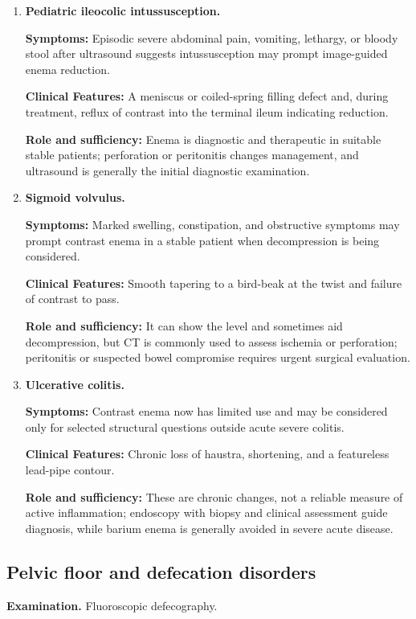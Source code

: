 \begin{enumerate}[leftmargin=*,itemsep=0.45em,topsep=0.4em]
\item \textbf{Pediatric ileocolic intussusception.}\par\noindent\textbf{Symptoms:} Episodic severe abdominal pain, vomiting, lethargy, or bloody stool after ultrasound suggests intussusception may prompt image-guided enema reduction.\par\noindent\textbf{Clinical Features:} A meniscus or coiled-spring filling defect and, during treatment, reflux of contrast into the terminal ileum indicating reduction.\par\noindent\textbf{Role and sufficiency:} Enema is diagnostic and therapeutic in suitable stable patients; perforation or peritonitis changes management, and ultrasound is generally the initial diagnostic examination.
\item \textbf{Sigmoid volvulus.}\par\noindent\textbf{Symptoms:} Marked swelling, constipation, and obstructive symptoms may prompt contrast enema in a stable patient when decompression is being considered.\par\noindent\textbf{Clinical Features:} Smooth tapering to a bird-beak at the twist and failure of contrast to pass.\par\noindent\textbf{Role and sufficiency:} It can show the level and sometimes aid decompression, but CT is commonly used to assess ischemia or perforation; peritonitis or suspected bowel compromise requires urgent surgical evaluation.
\item \textbf{Ulcerative colitis.}\par\noindent\textbf{Symptoms:} Contrast enema now has limited use and may be considered only for selected structural questions outside acute severe colitis.\par\noindent\textbf{Clinical Features:} Chronic loss of haustra, shortening, and a featureless lead-pipe contour.\par\noindent\textbf{Role and sufficiency:} These are chronic changes, not a reliable measure of active inflammation; endoscopy with biopsy and clinical assessment guide diagnosis, while barium enema is generally avoided in severe acute disease.
\end{enumerate}

\subsection{Pelvic floor and defecation disorders}
\textbf{Examination.} Fluoroscopic defecography.

